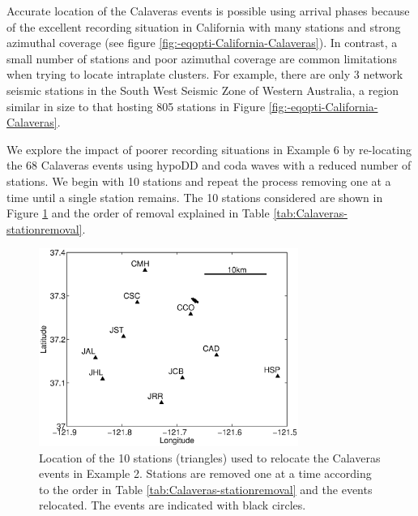 \documentclass[extra]{gji}
\begin{document}
Accurate location of the Calaveras events is possible using arrival
phases because of the excellent recording situation in California
with many stations and strong azimuthal coverage (see figure
\ref{fig:-eqopti-California-Calaveras}). In contrast, a small number
of stations and poor azimuthal coverage are common limitations when
trying to locate intraplate clusters. For example, there are
only 3 network seismic stations in the South West Seismic Zone of
Western Australia, a region similar in size to that hosting 805
stations in Figure \ref{fig:-eqopti-California-Calaveras}.

We explore the impact of poorer recording situations in Example 6 by
re-locating the 68 Calaveras events  using hypoDD and coda waves
with a reduced number of stations. We begin with 10 stations and
repeat the process removing one at a time until a single station
remains. The 10 stations considered are shown in Figure
\ref{fig:-eqopti-Calaveras-substations} and the order of removal
explained in Table \ref{tab:Calaveras-stationremoval}.


\begin{figure}
\noindent\includegraphics[width =
20pc]{diags/CalaverasMap/matlab/Calaveras_substationmap}
\caption{Location of the 10 stations (triangles) used to relocate
the Calaveras events in Example 2. Stations are removed one at a
time according to the order in Table
\ref{tab:Calaveras-stationremoval} and the events relocated. The
events are indicated with black circles.}
\label{fig:-eqopti-Calaveras-substations}
\end{figure}
\end{document}
